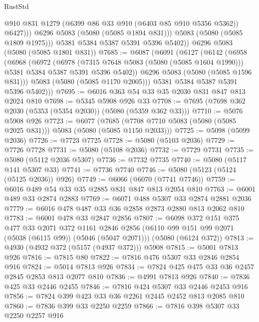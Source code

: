 \begin{lexlean}{RustStd}
\begin{coremodule}
                  @910
                  @831
                  @1279
                  (@6399 @86 @33 @910 (@6403 @85 @910 @5356 @5362))
                  @6427)))
            @6296
            @5083
            (@5080 (@5085 @1894 @831)))
          @5083
          (@5080 (@5085 @1809 @1975)))
        @5381
        @5384
        @5387
        @5391
        @5396
        @5402))
    @6296
    @5083
    (@5080 (@5085 @1801 @831))
@7685 := @6087
    (@6091
      (@6127
        (@6142
          (@6958
            (@6968
              (@6972
                (@6978
                  (@7315 @7648 @5083 (@5080 (@5085 @1604 @1990)))
                  @5381
                  @5384
                  @5387
                  @5391
                  @5396
                  @5402))
              @6296
              @5083
              (@5080 (@5085 @1596 @831)))
            @5083
            (@5080 (@5085 @1170 @2005)))
          @5381
          @5384
          @5387
          @5391
          @5396
          @5402)))
@7695 := @6016 @363 @54 @33 @35 @2030 @831 @847 @813 @2024 @810
@7698 := @5345 @5908 @926 @33
@7708 := @7695 (@7698 @362 @2030 (@5353 (@5354 @2030)) (@5080 (@5359 @362 @33)))
@7710 := @5076 @5908 @926
@7723 := @6077
    (@7685 (@7708 @7710 @5083 (@5080 (@5085 @2025 @831))) @5083 (@5080 (@5085 @1150 @2033)))
@7725 := @5098 (@5099 @2036)
@7726 := @7723 @7725
@7728 := @5080 (@5103 @2036)
@7729 := @7726 @7728
@7731 := @5080 (@5108 @2036)
@7732 := @7729 @7731
@7735 := @5080 (@5112 @2036 @5307)
@7736 := @7732 @7735
@7740 := @5080 (@5117 @141 @5307 @33)
@7741 := @7736 @7740
@7746 := @5080 (@5123 (@5124 (@5125 @2036)) @926)
@7749 := @6066 (@6070 (@7741 @7746))
@7759 := @6016 @489 @54 @33 @35 @2885 @831 @847 @813 @2054 @810
@7763 := @6001 @489 @33 @2874 @2883
@7769 := @6071 @488 @5307 @33 @2874 @2881 @2036
@7779 := @6016 @478 @487 @33 @36 @2858 @2873 @2880 @813 @2062 @810
@7783 := @6001 @478 @33 @2847 @2856
@7807 := @6098
    @372
    @151
    @375
    @477
    @33
    @2071
    @372
    @1161
    @2846
    @2856
    (@6110 @99 @151 @99 @2071 (@5038 (@6115 @99)) (@5046 (@5047 @2071)))
    (@5080 (@6124 @372))
@7813 := @4930 (@4932 @372 (@5157 (@4937 @372))) @5908
@7815 := @5001 @7813 @926
@7816 := @7815 @80
@7822 := @7816 @476 @5307 @33 @2846 @2854 @916
@7824 := @5014 @7813 @926
@7834 := @7824 @425 @475 @33 @36 @2457 @2845 @2853 @813 @2077 @810
@7836 := @4991 @7813 @926
@7840 := @7836 @425 @33 @2446 @2455
@7846 := @7816 @424 @5307 @33 @2446 @2453 @916
@7856 := @7824 @399 @423 @33 @36 @2261 @2445 @2452 @813 @2085 @810
@7860 := @7836 @399 @33 @2250 @2259
@7866 := @7816 @398 @5307 @33 @2250 @2257 @916

\end{coremodule}
\end{lexlean}
